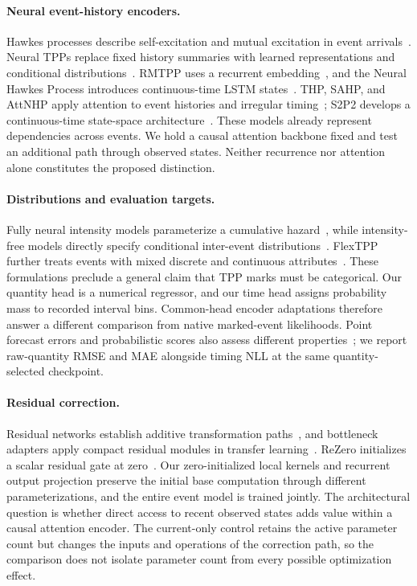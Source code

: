 \documentclass[runningheads]{llncs}
\begin{document}
\paragraph{Neural event-history encoders.}
Hawkes processes describe self-excitation and mutual excitation in event arrivals~\cite{hawkes1971spectra}. Neural TPPs replace fixed history summaries with learned representations and conditional distributions~\cite{shchur2021review}. RMTPP uses a recurrent embedding~\cite{du2016rmtpp}, and the Neural Hawkes Process introduces continuous-time LSTM states~\cite{mei2017nhp}. THP, SAHP, and AttNHP apply attention to event histories and irregular timing~\cite{zuo2020thp,zhang2020sahp,yang2022anhp}; S2P2 develops a continuous-time state-space architecture~\cite{chang2025s2p2}. These models already represent dependencies across events. We hold a causal attention backbone fixed and test an additional path through observed states. Neither recurrence nor attention alone constitutes the proposed distinction.

\paragraph{Distributions and evaluation targets.}
Fully neural intensity models parameterize a cumulative hazard~\cite{omi2019fully}, while intensity-free models directly specify conditional inter-event distributions~\cite{shchur2020intensityfree}. FlexTPP further treats events with mixed discrete and continuous attributes~\cite{draxler2025flextpp}. These formulations preclude a general claim that TPP marks must be categorical. Our quantity head is a numerical regressor, and our time head assigns probability mass to recorded interval bins. Common-head encoder adaptations therefore answer a different comparison from native marked-event likelihoods. Point forecast errors and probabilistic scores also assess different properties~\cite{hyndman2006accuracy,gneiting2007proper}; we report raw-quantity RMSE and MAE alongside timing NLL at the same quantity-selected checkpoint.

\paragraph{Residual correction.}
Residual networks establish additive transformation paths~\cite{he2016residual}, and bottleneck adapters apply compact residual modules in transfer learning~\cite{houlsby2019adapters}. ReZero initializes a scalar residual gate at zero~\cite{bachlechner2021rezero}. Our zero-initialized local kernels and recurrent output projection preserve the initial base computation through different parameterizations, and the entire event model is trained jointly. The architectural question is whether direct access to recent observed states adds value within a causal attention encoder. The current-only control retains the active parameter count but changes the inputs and operations of the correction path, so the comparison does not isolate parameter count from every possible optimization effect.
\end{document}
